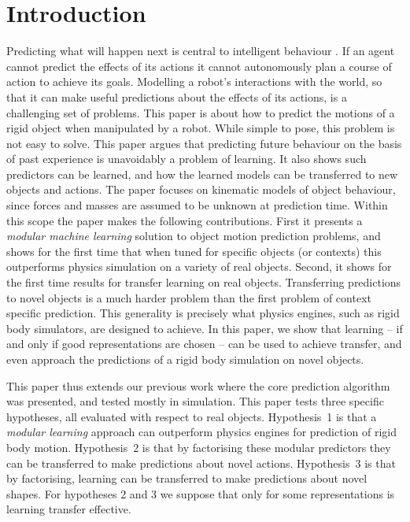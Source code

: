 \section{Introduction}\label{sec:Introduction}

Predicting what will happen next is central to intelligent behaviour \citep{craik1967nature}. If an agent cannot predict the effects of its actions it cannot autonomously plan a course of action to achieve its goals. Modelling a robot's interactions with the world, so that it can make useful predictions about the effects of its actions, is a challenging set of problems. This paper is about how to predict the motions of a rigid object when manipulated by a robot. While simple to pose, this problem is not easy to solve. This paper argues that predicting future behaviour on the basis of past experience is unavoidably a problem of learning. It also shows such predictors can be learned, and how the learned models can be transferred to new objects and actions. The paper focuses on kinematic models of object behaviour, since forces and masses are assumed to be unknown at prediction time. Within this scope the paper makes the following contributions. First it presents a {\em modular machine learning} solution to object motion prediction problems, and shows for the first time that when tuned for specific objects (or contexts) this outperforms physics simulation on a variety of real objects.  Second, it shows for the first time results for transfer learning on real objects. Transferring predictions to novel objects is a much harder problem than the first problem of context specific prediction. This generality is precisely what physics engines, such as rigid body simulators, are designed to achieve. In this paper, we show that learning -- if and only if good representations are chosen -- can be used to achieve transfer, and even approach the predictions of a rigid body simulation on novel objects.

This paper thus extends our previous work \citep{kopicki_prediction_2010,kopicki-etal-icra11}  where the core prediction algorithm was presented, and tested mostly in simulation.  This paper tests three specific hypotheses, all evaluated with respect to real objects. Hypothesis~1 is that a {\em modular learning} approach can outperform physics engines for prediction of rigid body motion.  Hypothesis~2 is that by factorising these modular predictors they can be transferred to make predictions about novel actions. Hypothesis~3 is that by factorising, learning can be transferred  to make predictions about novel shapes. For hypotheses 2 and 3 we suppose that only for some representations is learning transfer effective.

